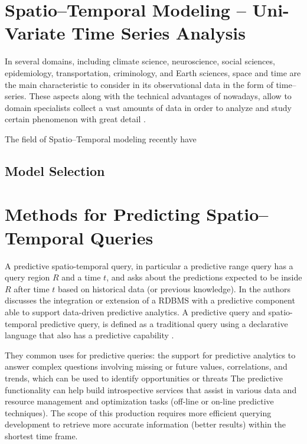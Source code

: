 





\section{Spatio--Temporal Modeling -- Uni-Variate Time Series Analysis}
\label{Sec:STModeling}

In several domains, including climate science, neuroscience, social sciences, epidemiology, transportation, criminology, and Earth sciences, space and time are the main characteristic to consider in its observational data in the form of time--series. These aspects along with the technical advantages of nowadays, allow to domain specialists collect a vast amounts of data in order to analyze and study certain phenomenon with great detail \cite{}. 

The field of Spatio--Temporal modeling recently have 

\subsection{Model Selection}



\section{Methods for Predicting Spatio--Temporal Queries}
\label{Sec:RelatedWorksQueries}

A predictive spatio-temporal query, in particular a predictive range query has a query region $R$ and a time $t$, and asks about the predictions expected to be inside $R$ after time $t$ based on historical data (or previous knowledge).  In \cite{Akdere2011} the authors discusses the integration or extension of a RDBMS with a predictive component able to support data-driven predictive analytics. A predictive query and spatio-temporal predictive query, is defined as a traditional query using a declarative language that also has a predictive capability \cite{Hendawi2012}. 

They common uses for predictive queries: the support for predictive analytics to answer complex questions involving missing or future values, correlations, and trends, which  can be used to identify opportunities or threats 
The predictive functionality can help build introspective services that assist in various data and resource management and optimization tasks (off-line or on-line predictive techniques). 
The  scope  of  this  production requires  more  efficient  querying development to  retrieve more accurate  information (better results)  within  the  shortest time  frame.



